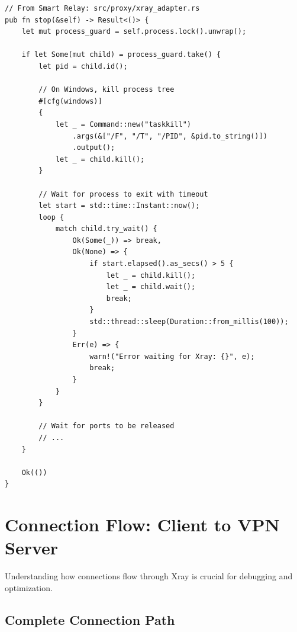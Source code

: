\begin{verbatim}
// From Smart Relay: src/proxy/xray_adapter.rs
pub fn stop(&self) -> Result<()> {
    let mut process_guard = self.process.lock().unwrap();
    
    if let Some(mut child) = process_guard.take() {
        let pid = child.id();
        
        // On Windows, kill process tree
        #[cfg(windows)]
        {
            let _ = Command::new("taskkill")
                .args(&["/F", "/T", "/PID", &pid.to_string()])
                .output();
            let _ = child.kill();
        }
        
        // Wait for process to exit with timeout
        let start = std::time::Instant::now();
        loop {
            match child.try_wait() {
                Ok(Some(_)) => break,
                Ok(None) => {
                    if start.elapsed().as_secs() > 5 {
                        let _ = child.kill();
                        let _ = child.wait();
                        break;
                    }
                    std::thread::sleep(Duration::from_millis(100));
                }
                Err(e) => {
                    warn!("Error waiting for Xray: {}", e);
                    break;
                }
            }
        }
        
        // Wait for ports to be released
        // ...
    }
    
    Ok(())
}
\end{verbatim}

\section{Connection Flow: Client to VPN Server}

Understanding how connections flow through Xray is crucial for debugging and optimization.

\subsection{Complete Connection Path}

